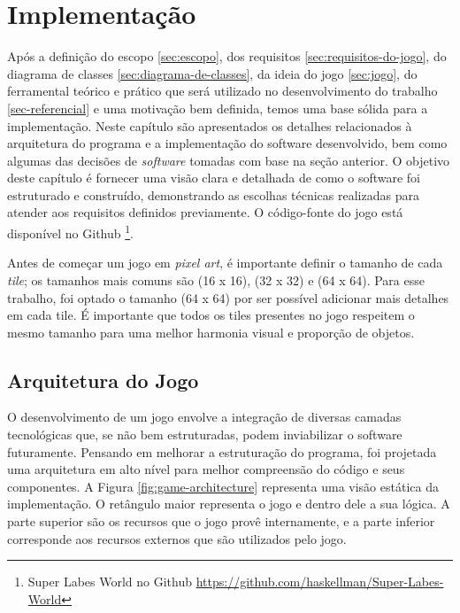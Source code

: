 \chapter{Implementação}
\label{sec-implementacao}

Após a definição do escopo \ref{sec:escopo}, dos requisitos \ref{sec:requisitos-do-jogo}, do diagrama de classes \ref{sec:diagrama-de-classes}, da ideia do jogo \ref{sec:jogo}, do ferramental teórico e prático que será utilizado no desenvolvimento do trabalho \ref{sec-referencial} e uma motivação bem definida, temos uma base sólida para a implementação. Neste capítulo são apresentados os detalhes relacionados à arquitetura do programa e a implementação do software desenvolvido, bem como algumas das decisões de \textit{software} tomadas com base na seção anterior. O objetivo deste capítulo é fornecer uma visão clara e detalhada de como o software foi estruturado e construído, demonstrando as escolhas técnicas realizadas para atender aos requisitos definidos previamente. O código-fonte do jogo está disponível no Github \footnote{Super Labes World no Github \url{https://github.com/haskellman/Super-Labes-World}}.

Antes de começar um jogo em \textit{pixel art}, é importante definir o tamanho de cada \textit{tile}; os tamanhos mais comuns são (16 x 16), (32 x 32) e (64 x 64). Para esse trabalho, foi optado o tamanho (64 x 64) por ser possível adicionar mais detalhes em cada tile. É importante que todos os tiles presentes no jogo respeitem o mesmo tamanho para uma melhor harmonia visual e proporção de objetos.

\section{Arquitetura do Jogo}
\label{sec:arquitetura-do-jogo}
O desenvolvimento de um jogo envolve a integração de diversas camadas tecnológicas que, se não bem estruturadas, podem inviabilizar o software futuramente. Pensando em melhorar a estruturação do programa, foi projetada uma arquitetura em alto nível para melhor compreensão do código e seus componentes. A Figura \ref{fig:game-architecture} representa uma visão estática da implementação. O retângulo maior representa o jogo e dentro dele a sua lógica. A parte superior são os recursos que o jogo provê internamente, e a parte inferior corresponde aos recursos externos que são utilizados pelo jogo.

